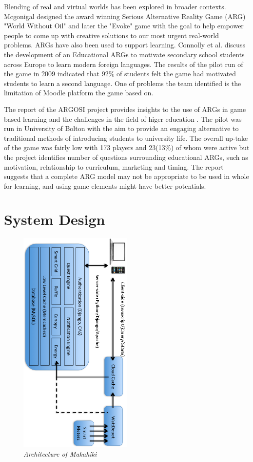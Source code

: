 \documentclass{acm_proc_article-sp}
\begin{document}
Blending of real and virtual worlds has been explored in broader contexts. 
Mcgonigal designed the award winning Serious Alternative Reality Game (ARG) 
"World Without Oil"\cite{worldwithoutoil} and later the "Evoke"
\cite{urgentevoke} game with the goal to help empower people to come up with
creative solutions to our most urgent real-world problems. ARGs have also been
used to support learning. Connolly et al. discuss the development of an 
Educational ARGs to motivate secondary school students across Europe to learn 
modern foreign languages\cite{connolly2009arguing}. The results of the pilot 
run of the game in 2009 indicated that 92\% of students felt the game had  
motivated students to learn a second language. One of problems
the team identified is the limitation of Moodle platform the game based on.

The report of the ARGOSI project provides insights to the use of ARGs in game
based learning and the challenges in the field of higer education
\cite{whitton2009alternate}. The pilot was run in University of Bolton with 
the aim to provide an engaging alternative to traditional methods of 
introducing students to university life. The overall up-take of the game was 
fairly low with 173 players and 23(13\%) of whom were active but the project
identifies number of questions surrounding educational ARGs, such as 
motivation, relationship to curriculum, marketing and timing. The report 
suggests that a complete ARG model may not be appropriate to be used in whole
for learning, and using game elements might have better potentials.

\section{System Design}
\begin{figure}[t!]
  \center
  \includegraphics[width=0.5\textwidth, angle=90]{makahiki-architecture.eps}
  \caption{\em \small Architecture of Makahiki}
  \label{fig:MakahikiArchitecture}
\end{figure}
\end{document}
